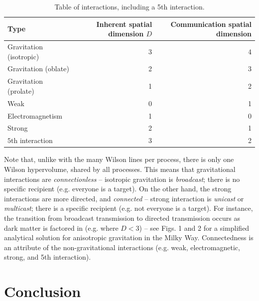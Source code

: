 \documentclass[12pt]{article}
\begin{document}
\begin{table}
\caption{Table of interactions, including a 5th interaction.}
\begin{center}
\begin{tabular}{| l | r | r |}
  \hline
  Type & Inherent spatial dimension $D$ & Communication spatial dimension \\
\hline
\hline


Gravitation (isotropic) & 3  & 4\\

\rowcolor{Gray}
Gravitation (oblate) & 2 & 3\\

Gravitation (prolate) & 1 & 2\\

\rowcolor{Gray}
Weak & 0 & 1\\

Electromagnetism & 1 & 0 \\

\rowcolor{Gray}
Strong & 2 & 1\\

$5$th interaction & 3 & 2 \\
  \hline
\end{tabular}
\end{center}
\end{table}


Note that, unlike with the many Wilson lines per process, there is only one Wilson hypervolume, shared by all processes.
This means that gravitational interactions are {\textit{connectionless}} -- isotropic gravitation is {\textit{broadcast}}; there is no specific recipient (e.g. everyone is a target).
On the other hand, the strong interactions are more directed, and {\textit{connected}} -- strong interaction is {\textit{unicast}} or {\textit{multicast}}; there is a specific recipient (e.g. not everyone is a target).
For instance, the transition from broadcast transmission to directed transmission occurs as dark matter is factored in (e.g. where $D < 3$) -- see Figs. 1 and 2 for a simplified analytical solution for anisotropic gravitation in the Milky Way.
Connectedness is an attribute of the non-gravitational interactions (e.g. weak, electromagnetic, strong, and 5th interaction).







\section{Conclusion}
\end{document}
